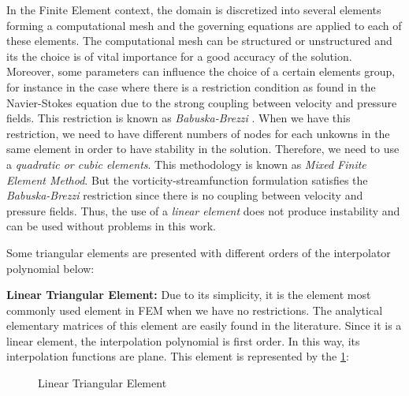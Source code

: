 In the Finite Element context, the domain is discretized into
several elements forming a computational mesh 
and the governing equations are applied to each of these elements.
The computational mesh can be structured or unstructured and 
its the choice is of
vital importance for a good accuracy of the solution. 
Moreover, some parameters can influence the choice of 
a certain elements group, 
for instance in the case where there is a restriction condition 
as found in the Navier-Stokes equation due to the strong coupling 
between velocity and pressure fields. 
This restriction is known as \textit{Babuska-Brezzi} 
\cite{babuska1971} \cite{brezzi1974}. 
When we have this restriction, 
we need to have different numbers of nodes for each unkowns 
in the same element in order to have stability in the solution.
Therefore, we need to use a \textit{quadratic or cubic elements}. 
This methodology is known as \textit{Mixed Finite Element Method}. 
But the vorticity-streamfunction formulation satisfies 
the \textit{Babuska-Brezzi} restriction since there is no coupling 
between velocity and pressure fields. 
Thus, the use of a \textit{linear element} does not produce 
instability and can be used without problems in this work.

\medskip
Some triangular elements are presented with different orders of the interpolator polynomial below:

\medskip
\noindent
\textbf{Linear Triangular Element:} 
Due to its simplicity, 
it is the element most commonly used element in FEM when 
we have no restrictions. The analytical elementary matrices 
of this element are easily found in the literature. 
Since it is a linear element, the interpolation
polynomial is first order. 
In this way, its interpolation functions are plane. 
This element is represented by the \ref{elemento triangular linear}:


\begin{figure}[H]
\begin{center}
\end{center}
\caption{Linear Triangular Element}
\label{elemento triangular linear}
\end{figure}

